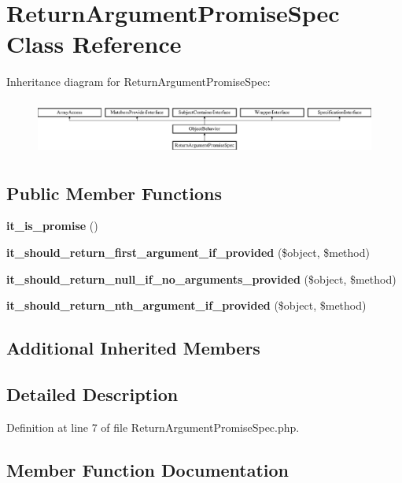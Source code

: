 \section{Return\+Argument\+Promise\+Spec Class Reference}
\label{classspec_1_1_prophecy_1_1_promise_1_1_return_argument_promise_spec}
Inheritance diagram for Return\+Argument\+Promise\+Spec\+:\begin{figure}[H]
\begin{center}
\leavevmode
\includegraphics[height=1.816216cm]{classspec_1_1_prophecy_1_1_promise_1_1_return_argument_promise_spec}
\end{center}
\end{figure}
\subsection*{Public Member Functions}
\begin{DoxyCompactItemize}
\item 
{\bf it\+\_\+is\+\_\+promise} ()
\item 
{\bf it\+\_\+should\+\_\+return\+\_\+first\+\_\+argument\+\_\+if\+\_\+provided} (\$object, \$method)
\item 
{\bf it\+\_\+should\+\_\+return\+\_\+null\+\_\+if\+\_\+no\+\_\+arguments\+\_\+provided} (\$object, \$method)
\item 
{\bf it\+\_\+should\+\_\+return\+\_\+nth\+\_\+argument\+\_\+if\+\_\+provided} (\$object, \$method)
\end{DoxyCompactItemize}
\subsection*{Additional Inherited Members}


\subsection{Detailed Description}


Definition at line 7 of file Return\+Argument\+Promise\+Spec.\+php.



\subsection{Member Function Documentation}

